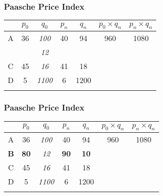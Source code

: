 \documentclass{beamer}
\begin{document}
\begin{frame}
\frametitle{Paasche Price Index}
\begin{center}
\LARGE
\begin{tabular}{|c||c|c||c|c||c|c|}
\hline  &\phantom{s}$p_0$\phantom{s}	&	$q_0$	&	$p_n$	&	$q_n$	&	$p_0 \times q_n$	&	$p_n \times q_n$	\\	\hline \hline
A & 36	&	\textit{100}	&	40	&	94	&	960	&	1080	\\	\hline
\textbf{{\color{red}{B}}} & \textbf{{\color{red}{80}}}	&	\textit{12}	&	\textbf{{\color{red}{90}}}	&	\textbf{{\color{red}{10}}}	&	\phantom{3600}	&	\phantom{4000}	\\	\hline

C & 45	&	\textit{16}	&	41	&	18	&	\phantom{720}	&	\phantom{656}	\\	\hline
D & 5	&	\textit{1100}	&	6	&	1200	&	\phantom{5500}	&	\phantom{6600}	\\	\hline \hline
& 	&		&		&		&	\phantom{10780}	&	\phantom{12336}	\\	\hline
\end{tabular} 
\end{center}
\end{frame}



\begin{frame}
\frametitle{Paasche Price Index}
\begin{center}
\LARGE
\begin{tabular}{|c||c|c||c|c||c|c|}
\hline  &\phantom{s}$p_0$\phantom{s}	&	$q_0$	&	$p_n$	&	$q_n$	&	$p_0 \times q_n$	&	$p_n \times q_n$	\\	\hline \hline
A & 36	&	\textit{100}	&	40	&	94	&	960	&	1080	\\	\hline
\textbf{B} & \textbf{80}	&	\textit{12}	&	\textbf{90}	&	\textbf{10}	&	\textbf{{\color{red}{3600}}}	&	\textbf{{\color{red}{4000}}}	\\	\hline
C & 45	&	\textit{16}	&	41	&	18	&	\phantom{720}	&	\phantom{656}	\\	\hline
D & 5	&	\textit{1100}	&	6	&	1200	&	\phantom{5500}	&	\phantom{6600}	\\	\hline \hline
& 	&		&		&		&	\phantom{10780}	&	\phantom{12336}	\\	\hline
\end{tabular} 
\end{center}
\end{frame}
\end{document}
